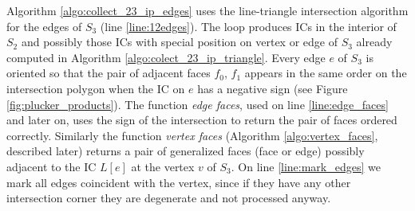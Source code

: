 \documentclass{elsarticle}
\begin{document}
Algorithm \ref{algo:collect_23_ip_edges} uses the line-triangle intersection algorithm for the edges of $S_3$ (line \ref{line:12edges}).
The loop produces ICs in the interior of $S_2$ and possibly those ICs with special position on vertex or edge of $S_3$ already computed in Algorithm \ref{algo:colect_23_ip_triangle}. 
Every edge $e$ of $S_3$ is oriented so that the pair of adjacent faces $f_0$, $f_1$ appears in the same order on the intersection polygon when the 
IC on $e$ has a negative sign (see Figure \ref{fig:plucker_products}). The function \emph{edge faces}, used on line \ref{line:edge_faces} and later on,
uses the sign of the intersection to return the pair of faces ordered correctly. 
Similarly the function \emph{vertex faces} (Algorithm \ref{algo:vertex_faces}, described later)
returns a pair of generalized faces (face or edge) possibly adjacent to the IC $L[e]$ at the vertex $v$ of $S_3$.
On line \ref{line:mark_edges} we mark all edges coincident with the vertex, since if they have any other intersection corner they are degenerate and 
not processed anyway.
\end{document}
